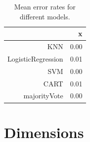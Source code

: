 \documentclass[a4paper,draft=false]{scrreprt}\usepackage[]{graphicx}\usepackage[]{color}
\begin{document}
\begin{table}[ht]
\centering
\begin{tabular}{rr}
  \hline
 & x \\ 
  \hline
KNN & 0.00 \\ 
  LogisticRegression & 0.01 \\ 
  SVM & 0.00 \\ 
  CART & 0.01 \\ 
  majorityVote & 0.00 \\ 
   \hline
\end{tabular}
\caption{Mean error rates for different models.\label{table:meanerror}} 
\end{table}


\chapter{Dimensions} %


\appendix
\appendixpage
\end{document}
